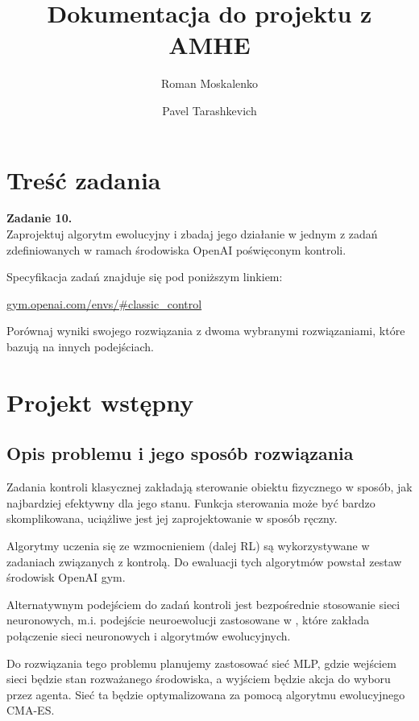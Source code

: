 \documentclass[12pt,a4paper]{article}
\title{Dokumentacja do projektu z AMHE}
\author{Roman Moskalenko \and Pavel Tarashkevich}
\date{}
\begin{document}
\maketitle
\tableofcontents
\newpage

\section{Treść zadania}

\textbf{Zadanie 10.}\\

Zaprojektuj algorytm ewolucyjny i zbadaj jego działanie w jednym z zadań zdefiniowanych w ramach środowiska OpenAI poświęconym kontroli.

Specyfikacja zadań znajduje się pod poniższym linkiem:

\href{https://gym.openai.com/envs/#classic\_control}{gym.openai.com/envs/\#classic\_control}

Porównaj wyniki swojego rozwiązania z dwoma wybranymi rozwiązaniami, które bazują na
innych podejściach.


\section{Projekt wstępny}

\subsection{Opis problemu i jego sposób rozwiązania}

Zadania kontroli klasycznej zakładają sterowanie obiektu fizycznego w sposób,
jak najbardziej efektywny dla jego stanu. Funkcja sterowania może być bardzo
skomplikowana, uciążliwe jest jej zaprojektowanie w sposób ręczny.

Algorytmy uczenia się ze wzmocnieniem (dalej RL) są wykorzystywane w zadaniach związanych z kontrolą.
Do ewaluacji tych algorytmów powstał zestaw środowisk OpenAI gym.

Alternatywnym podejściem do zadań kontroli jest bezpośrednie stosowanie sieci
neuronowych, m.i. podejście neuroewolucji zastosowane w \cite{scalable_alternative},
które zakłada połączenie sieci neuronowych i algorytmów ewolucyjnych.

Do rozwiązania tego problemu planujemy zastosować sieć MLP, gdzie wejściem sieci
będzie stan rozważanego środowiska, a wyjściem będzie akcja do wyboru przez agenta.
Sieć ta będzie optymalizowana za pomocą algorytmu ewolucyjnego CMA-ES.
\end{document}
